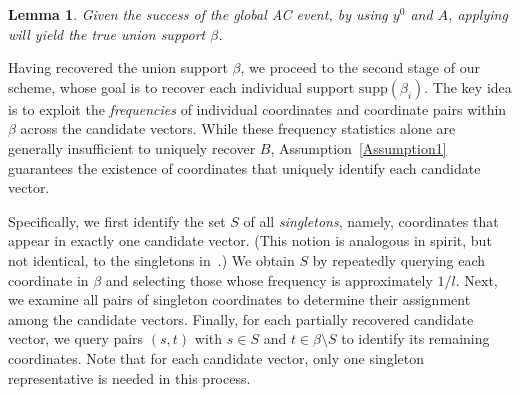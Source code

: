 \documentclass{article}
\newcommand{\xl}[1]{{\color{blue}#1}}
\newtheorem{lemma}{Lemma}[section]
\newcommand{\supp}{\mathrm{supp}}
\begin{document}
\begin{lemma}\label{lem:trueb}
    Given the success of the global AC event, by using $y^0$ and $A$, applying \cite[Algorithm~3]{li2025support} will yield the true union support $\beta$. 
\end{lemma}


Having recovered the union support $\beta$, we proceed to the second stage of our scheme, whose goal is to recover each individual support $\supp(\beta_i)$. The key idea is to exploit the \emph{frequencies} of individual coordinates and coordinate pairs within $\beta$ across the candidate vectors. While these frequency statistics alone are generally insufficient to uniquely recover $B$, Assumption~\ref{Assumption1} guarantees the existence of coordinates that uniquely identify each candidate vector. 

Specifically, we first identify the set $S$ of all \emph{singletons}, namely, coordinates that appear in exactly one candidate vector. (This notion is analogous in spirit, but not identical, to the singletons in~\cite{li2025support}.) We obtain $S$ by repeatedly querying each coordinate in $\beta$ and selecting those whose frequency is approximately $1/l$. Next, we examine all pairs of singleton coordinates to determine their assignment among the candidate vectors. Finally, for each partially recovered candidate vector, we query pairs $(s,t)$ with $s\in S$ and $t\in\beta\setminus S$ to identify its remaining coordinates. Note that for each candidate vector, only one singleton representative is needed in this process. 
\end{document}
